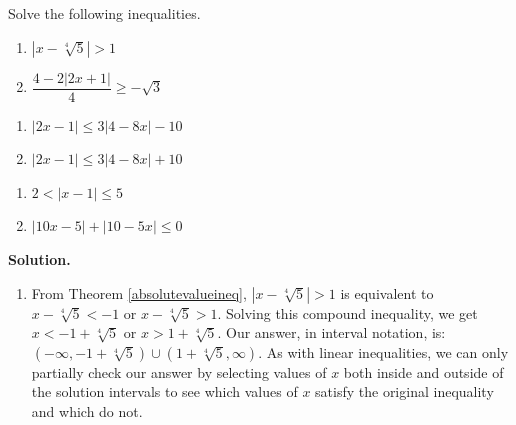 \documentclass{ximera}
\begin{document}
\begin{example}  Solve the following inequalities.

\begin{enumerate}

\item  $\left|x-\sqrt[4]{5} \right| > 1$

\item  $\dfrac{4 - 2|2x+1|}{4} \geq -\sqrt{3}$

\setcounter{HW}{\value{enumi}}
\end{enumerate}


\begin{enumerate}
\setcounter{enumi}{\value{HW}}

\item  $|2x - 1| \leq 3|4 - 8x| - 10$

\item  $|2x - 1| \leq 3|4 - 8x| + 10$

\setcounter{HW}{\value{enumi}}
\end{enumerate}



\begin{enumerate}
\setcounter{enumi}{\value{HW}}



\item  $2 < |x-1| \leq 5$

\item  $|10 x - 5| +|10 - 5x| \leq 0$


\setcounter{HW}{\value{enumi}}
\end{enumerate}


{\bf Solution.}  

\begin{enumerate}

\item  From Theorem \ref{absolutevalueineq}, $\left|x-\sqrt[4]{5} \right| > 1$ is equivalent to $x-\sqrt[4]{5} < -1$ or $x-\sqrt[4]{5} > 1$. Solving this compound inequality, we get $x < -1 + \sqrt[4]{5}$ or $x > 1 + \sqrt[4]{5}$.  Our answer, in interval notation, is:  $\left(-\infty,-1 + \sqrt[4]{5} \right) \cup \left(1 + \sqrt[4]{5},\infty \right)$.  As with linear inequalities, we can only partially check our answer by selecting values of $x$ both inside and outside of the solution intervals to see which values of $x$ satisfy the original inequality and which do not.


\end{enumerate}
\end{example}
\end{document}
